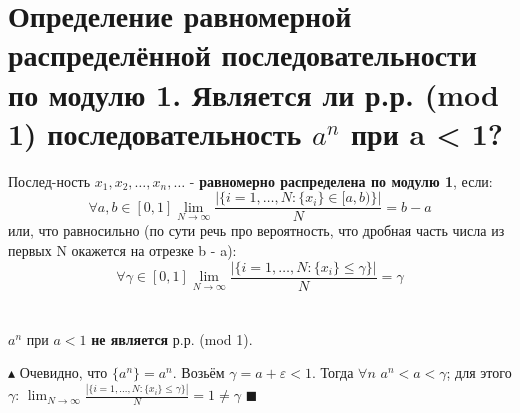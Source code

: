 \setcounter{section}{35}
\section{Определение равномерной распределённой последовательности по модулю 1. Является ли р.р. (mod 1) последовательность $a^n$ при a < 1?}

Послед-ность $x_1, x_2, \dots, x_n, \dots$ - \textbf{равномерно распределена по модулю 1}, если:
\[ \forall a, b \in [0, 1] \lim_{N \to \infty} \frac{|\{i = 1, \dots, N: \{x_i\} \in [a, b)\}|}{N} = b - a \]
или, что равносильно (по сути речь про вероятность, что дробная часть числа из первых N окажется на отрезке b - a):
\[ \forall \gamma \in [0, 1] \lim_{N \to \infty} \frac{|\{i = 1, \dots, N: \{x_i\} \leqslant \gamma \}|}{N} = \gamma \] \\
\\
$a^n$ при $a<1$ \textbf{не является} р.р. (mod 1). \par
$\blacktriangle$ Очевидно, что $\{ a^n \} = a^n$. Возьём $\gamma = a + \varepsilon < 1$. Тогда $\forall n$ $a^n < a < \gamma$; для этого $\gamma$: $\lim_{N \to \infty} \frac{|\{i = 1, \dots, N: \{x_i\} \leqslant \gamma \}|}{N} = 1 \neq \gamma$ $\blacksquare$